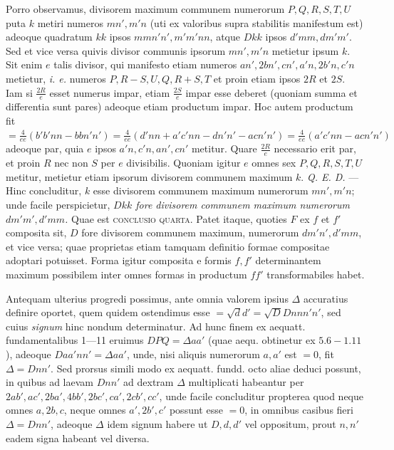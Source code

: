 Porro observamus, divisorem maximum communem numerorum $P,\allowbreak Q,\allowbreak R,\allowbreak S,\allowbreak T,\allowbreak U$ puta $k$ metiri numeros $mn',m'n$ (uti ex valoribus supra stabilitis manifestum est) adeoque quadratum $kk$ ipsos $mmn'n',m'm'nn$, atque $Dkk$ ipsos $d'mm,dm'm'$. Sed et vice versa quivis divisor communis ipsorum $mn',m'n$ metietur ipsum $k$. Sit enim $e$ talis divisor, qui manifesto etiam numeros $an',2bn',cn',a'n,2b'n,c'n$ metietur, \textit{i. e.} numeros $P,R-S,U,Q,R+S,T$ et proin etiam ipsos $2R$ et $2S$. Iam si $\frac{2R}{e}$ esset numerus impar, etiam $\frac{2S}{e}$ impar esse deberet (quoniam summa et differentia sunt pares) adeoque etiam productum impar. Hoc autem productum fit $=\frac{4}{ee}(b'b'nn-bbn'n')=\frac{4}{ee}(d'nn+a'c'nn-dn'n'-acn'n')=\frac{4}{ee}(a'c'nn-acn'n')$ adeoque par, quia $e$ ipsos $a'n,c'n,an',cn'$ metitur. Quare $\frac{2R}{e}$ necessario erit par, et proin $R$ nec non $S$ per $e$ divisibilis. Quoniam igitur $e$ omnes sex $P,Q,R,S,T,U$ metitur, metietur etiam ipsorum divisorem communem maximum $k$. \textit{Q. E. D.} --- Hinc concluditur, $k$ esse divisorem communem maximum numerorum $mn',m'n$; unde facile perspicietur, \textit{$Dkk$ fore divisorem communem maximum numerorum $dm'm',d'mm$.} Quae est \textsc{conclusio quarta}. Patet itaque, quoties $F$ ex $f$ et $f'$ composita sit, $D$ fore divisorem communem maximum, numerorum $dm'n',d'mm$, et vice versa; quae proprietas etiam tamquam definitio formae compositae adoptari potuisset. Forma igitur composita e
formis $f,f'$ determinantem maximum possibilem inter omnes formas in productum $ff'$ transformabiles habet.

Antequam ulterius progredi possimus, ante omnia valorem ipsius $\Delta$ accuratius definire oportet, quem quidem ostendimus esse $=\surd dd'=\surd DDnnn'n'$, sed cuius \textit{signum} hinc nondum determinatur. Ad hunc finem ex aequatt. fundamentalibus 1---11 eruimus $DPQ=\Delta aa'$ (quae aequ. obtinetur ex $5.6-1.11$), adeoque $Daa'nn'=\Delta aa'$, unde, nisi aliquis numerorum $a,a'$ est $=0$, fit $\Delta=Dnn'$. Sed prorsus simili modo ex aequatt. fundd. octo aliae deduci possunt, in quibus ad laevam $Dnn'$ ad dextram $\Delta$ multiplicati habeantur per $2ab',ac',2ba',4bb',2bc',ca',2cb',cc'$, unde facile concluditur propterea quod neque omnes $a,2b,c$, neque omnes $a',2b',c'$ possunt esse $=0$, in omnibus casibus fieri $\Delta=Dnn'$, adeoque $\Delta$ idem signum habere ut $D,d,d'$ vel oppositum, prout $n,n'$ eadem signa habeant vel diversa.


